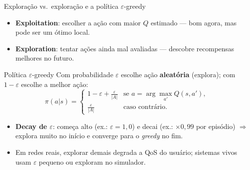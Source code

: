 \documentclass[aspectratio=169,11pt]{beamer}
\begin{document}
\begin{frame}{Exploração vs.\ exploração e a política $\varepsilon$-greedy}
  \begin{itemize}
    \item \textbf{Exploitation}: escolher a ação com maior $Q$ estimado --- bom agora, mas pode ser um ótimo local.
    \item \textbf{Exploration}: tentar ações ainda mal avaliadas --- descobre recompensas melhores no futuro.
  \end{itemize}
  \begin{block}{Política $\varepsilon$-greedy}
    Com probabilidade $\varepsilon$ escolhe ação \textbf{aleatória} (explora); com $1-\varepsilon$ escolhe a melhor ação:
    $$
    \pi(a|s) = \begin{cases} 1-\varepsilon + \tfrac{\varepsilon}{|A|} & \text{se } a = \arg\max_{a'} Q(s,a'),\\[2mm] \tfrac{\varepsilon}{|A|} & \text{caso contrário.} \end{cases}
    $$
  \end{block}
  \begin{itemize}
    \item \textbf{Decay de $\varepsilon$}: começa alto (ex.: $\varepsilon = 1{,}0$) e decai (ex.: $\times 0{,}99$ por episódio) $\Rightarrow$ explora muito no início e converge para o \emph{greedy} no fim.
    \item Em redes reais, explorar demais degrada a QoS do usuário; sistemas vivos usam $\varepsilon$ pequeno ou exploram no simulador.
  \end{itemize}
\end{frame}
\end{document}
